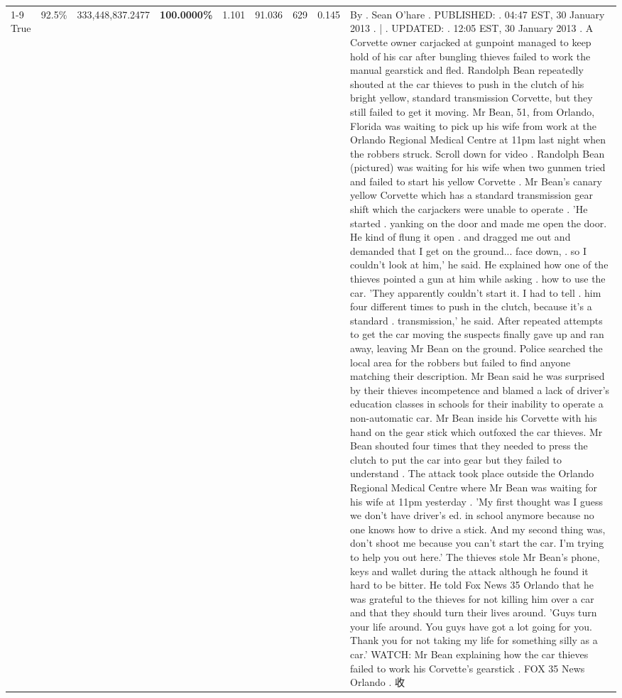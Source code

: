 \begin{table}[H]
\begin{tabular}{lllrlllll}
\cline{1-9} \cline{2-9}
True & 92.5\% & 333,448,837.2477 & \bfseries \color{red} 100.0000\% & 1.101 & 91.036 & 629 & 0.145 & By . Sean O'hare . PUBLISHED: . 04:47 EST, 30 January 2013 . | . UPDATED: . 12:05 EST, 30 January 2013 . A Corvette owner carjacked at gunpoint managed to keep hold of his car after bungling thieves failed to work the manual gearstick and fled. Randolph Bean repeatedly shouted at the car thieves to push in the clutch of his bright yellow, standard transmission Corvette, but they still failed to get it moving. Mr Bean, 51, from Orlando, Florida was waiting to pick up his wife from work at the Orlando Regional Medical Centre at 11pm last night when the robbers struck. Scroll down for video . Randolph Bean (pictured) was waiting for his wife when two gunmen tried and failed to start his yellow Corvette . Mr Bean's canary yellow Corvette which has a standard transmission gear shift which the carjackers were unable to operate . 'He started . yanking on the door and made me open the door. He kind of flung it open . and dragged me out and demanded that I get on the ground... face down, . so I couldn't look at him,' he said. He explained how one of the thieves pointed a gun at him while asking . how to use the car. 'They apparently couldn't start it. I had to tell . him four different times to push in the clutch, because it's a standard . transmission,' he said. After repeated attempts to get the car moving the suspects finally gave up and ran away, leaving Mr Bean on the ground. Police searched the local area for the robbers but failed to find anyone matching their description. Mr Bean said he was surprised by their thieves incompetence and blamed a lack of driver's education classes in schools for their inability to operate a non-automatic car. Mr Bean inside his Corvette with his hand on the gear stick which outfoxed the car thieves. Mr Bean shouted four times that they needed to press the clutch to put the car into gear but they failed to understand . The attack took place outside the Orlando Regional Medical Centre where Mr Bean was waiting for his wife at 11pm yesterday . 'My first thought was I guess we don't have driver's ed. in school anymore because no one knows how to drive a stick. And my second thing was, don't shoot me because you can't start the car. I'm trying to help you out here.' The thieves stole Mr Bean's phone, keys and wallet during the attack although he found it hard to be bitter. He told Fox News 35 Orlando that he was grateful to the thieves for not killing him over a car and that they should turn their lives around. 'Guys turn your life around. You guys have got a lot going for you. Thank you for not taking my life for something silly as a car.' WATCH: Mr Bean explaining how the car thieves failed to work his Corvette's gearstick . FOX 35 News Orlando . 收 \\

\end{tabular}
\end{table}
